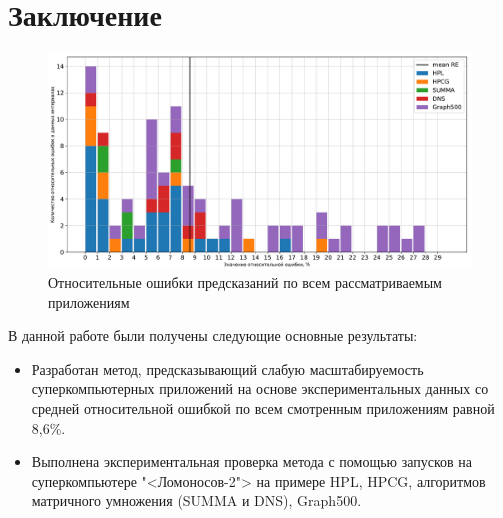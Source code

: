 \section{Заключение}
	\begin{figure}
		\centering
		\includegraphics[width=\textwidth]{./images/RE_graph}
		\caption{Относительные ошибки предсказаний по всем рассматриваемым приложениям}
		\label{RESULT}
	\end{figure}
	В данной работе были получены следующие основные результаты:
	\begin{itemize}
		\item Разработан метод, предсказывающий слабую масштабируемость суперкомпьютерных приложений на основе экспериментальных данных со средней относительной ошибкой по всем смотренным приложениям равной 8,6\%.
		\item Выполнена экспериментальная проверка метода с помощью запусков на суперкомпьютере "<Ломоносов-2"> на примере HPL, HPCG, алгоритмов матричного умножения (SUMMA и DNS), Graph500.
	\end{itemize}

